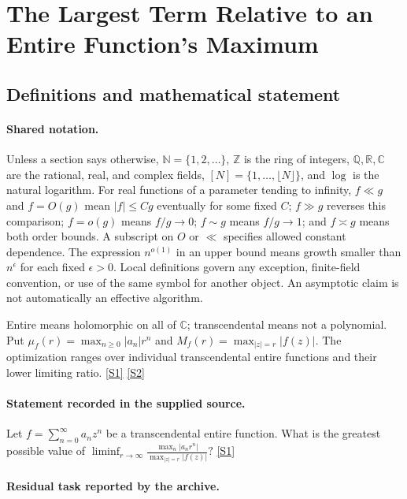 \documentclass[11pt,a4paper]{article}
\newcommand{\N}{\mathbb{N}}
\newcommand{\Z}{\mathbb{Z}}
\newcommand{\Q}{\mathbb{Q}}
\newcommand{\R}{\mathbb{R}}
\newcommand{\C}{\mathbb{C}}
\newcommand{\sref}[2]{\hyperlink{source:#1:#2}{[S#2]}}
\begin{document}
\section{The Largest Term Relative to an Entire Function's Maximum}\label{statement}


\subsection{Definitions and mathematical statement}

\paragraph{Shared notation.}Unless a section says otherwise, $\N=\{1,2,\ldots\}$,
$\Z$ is the ring of integers, $\Q,\R,\C$ are the rational, real, and complex
fields, $[N]=\{1,\ldots,\lfloor N\rfloor\}$, and $\log$ is the natural
logarithm. For real functions of a parameter tending to infinity,
$f\ll g$ and $f=O(g)$ mean $|f|\leq Cg$ eventually for some fixed $C$;
$f\gg g$ reverses this comparison; $f=o(g)$ means $f/g\to0$;
$f\sim g$ means $f/g\to1$; and $f\asymp g$ means both order bounds.
A subscript on $O$ or $\ll$ specifies allowed constant dependence.
The expression $n^{o(1)}$ in an upper bound means growth smaller than
$n^\epsilon$ for each fixed $\epsilon>0$. Local definitions govern any
exception, finite-field convention, or use of the same symbol for another
object. An asymptotic claim is not automatically an effective algorithm.



Entire means holomorphic on all of $\C$; transcendental means not a polynomial. Put $\mu_f(r)=\max_{n\geq0}|a_n|r^n$ and $M_f(r)=\max_{|z|=r}|f(z)|$. The optimization ranges over individual transcendental entire functions and their lower limiting ratio. \sref{statement}{1} \sref{statement}{2}

\paragraph{Statement recorded in the supplied source.}
Let $f=\sum_{n=0}^\infty a_nz^n$ be a transcendental entire function. What is the greatest possible value of $ \liminf_{r\to \infty} \frac{\max_n\lvert a_nr^n\rvert}{\max_{\lvert z\rvert=r}\lvert f(z)\rvert}? $ \sref{statement}{1}

\paragraph{Residual task reported by the archive.}
\end{document}
